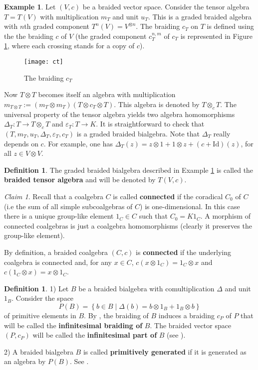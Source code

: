 \documentclass[english]{amsart}
\numberwithin{equation}{section}
\numberwithin{figure}{section}
\theoremstyle{plain}
\theoremstyle{definition}
\newtheorem{defn}[thm]{Definition}
\theoremstyle{definition}
\newtheorem{example}[thm]{Example}
\theoremstyle{remark}
\newtheorem{claim}[thm]{Claim}
\theoremstyle{remark}
\theoremstyle{plain}
\theoremstyle{plain}
\theoremstyle{plain}
\begin{document}
\begin{example}
\label{ex: tensor algebra} Let $\left(V,c\right)$ be a braided vector
space. Consider the tensor algebra $T=T(V)$ with multiplication $m_{T}$
and unit $u_{T}$. This is a graded braided algebra with $n$th graded
component $T^n(V)=V^{\otimes n}$. The braiding $c_{T}$ on $T$ is defined using the the braiding $c$ of
$V$ (the graded component $c_T^{n,m}$ of $c_T$ is represented in Figure \ref{Fig:cT}, where each crossing stands for a copy of $c$).

\begin{figure}[h]\texttt{[image: ct]}\caption{The braiding $c_T$}\label{Fig:cT}
\end{figure}

Now $T\otimes T$ becomes itself an algebra with multiplication $m_{T\otimes T}:=\left(m_{T}\otimes m_{T}\right)\left(T\otimes c_{T}\otimes T\right).$
This algebra is denoted by $T\otimes_{c}T.$ The universal property
of the tensor algebra yields two algebra homomorphisms $\Delta_{T}:T\rightarrow T\otimes_{c}T$
and $\varepsilon_{T}:T\rightarrow K$. It is straightforward to check
that $(T,m_{T},u_{T},\Delta_{T},\varepsilon_{T},c_{T})$ is a graded
braided bialgebra. Note that $\Delta_{T}$ really depends on $c$.
For example, one has $\Delta_{T}\left(z\right)=z\otimes1+1\otimes z+\left(c+\mathrm{Id}\right)\left(z\right)$,
for all $z\in V\otimes V$. \end{example}
\begin{defn}
The graded braided bialgebra described in Example \ref{ex: tensor algebra}
is called the \textbf{braided tensor algebra} and will be denoted
by $T(V,c)$. \end{defn}
\begin{claim}
\label{nn: connected} Recall that a coalgebra $C$ is called \textbf{connected}
if the coradical $C_{0}$ of $C$ (i.e the sum of all simple subcoalgebras
of $C$) is one-dimensional. In this case there is a unique group-like
element $1_{C}\in C$ such that $C_{0}=K1_{C}$. A morphism of connected
coalgebras is just a coalgebra homomorphisms (clearly it preserves
the group-like element).

By definition, a braided coalgebra $\left(C,c\right)$ is \textbf{connected}
if the underlying coalgebra is connected and, for any $x\in C$, $c(x\otimes1_{C})=1_{C}\otimes x$
and $c(1_{C}\otimes x)=x\otimes1_{C}$. \end{claim}
\begin{defn}
1) Let $B$ be a braided bialgebra with comultiplication $\Delta$
and unit $1_{B}$. Consider the space \[
P\left(B\right)=\left\{ b\in B\mid\Delta\left(b\right)=b\otimes1_{B}+1_{B}\otimes b\right\} \]
 of primitive elements in $B$. By \cite[Lemma 2.10]{Ardizzoni-Universal},
the braiding of $B$ induces a braiding $c_{P}$ of $P$ that will
be called the \textbf{infinitesimal braiding of} $B$. The braided
vector space $(P,c_{P})$ will be called the \textbf{infinitesimal
part of} $B$ (see \cite[Definition 2.11]{Ardizzoni-Universal}).

2) A braided bialgebra $B$ is called \textbf{primitively generated}
if it is generated as an algebra by $P\left(B\right)$. See \cite[page 239]{Milnor-Moore}.\end{defn}
\end{document}

